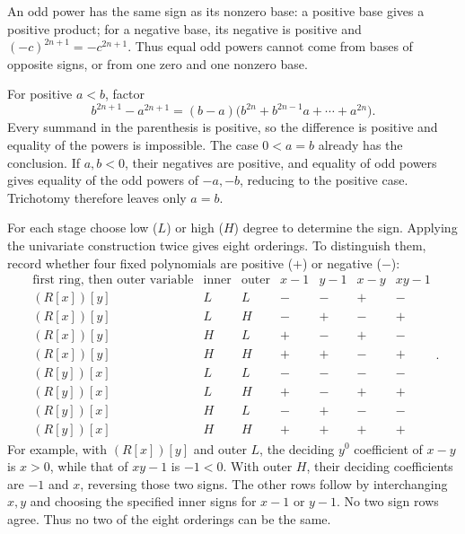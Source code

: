 An odd power has the same sign as its nonzero base: a positive base gives a positive product; for a negative base, its negative is positive and $( -c)^{2n+1}=-c^{2n+1}$. Thus equal odd powers cannot come from bases of opposite signs, or from one zero and one nonzero base.\par
For positive $a<b$, factor
\[b^{2n+1}-a^{2n+1}=(b-a)\bigl(b^{2n}+b^{2n-1}a+\cdots+a^{2n}\bigr).
\]
Every summand in the parenthesis is positive, so the difference is positive and equality of the powers is impossible. The case $0<a=b$ already has the conclusion. If $a,b<0$, their negatives are positive, and equality of odd powers gives equality of the odd powers of $-a,-b$, reducing to the positive case. Trichotomy therefore leaves only $\boxed{a=b}$.

For each stage choose low ($L$) or high ($H$) degree to determine the sign. Applying the univariate construction twice gives eight orderings. To distinguish them, record whether four fixed polynomials are positive ($+$) or negative ($-$):
\[
\begin{array}{c|cc|cccc}
\text{first ring, then outer variable}&\text{inner}&\text{outer}&x-1&y-1&x-y&xy-1\\\hline
(R[x])[y]&L&L&-&-&+&-\\
(R[x])[y]&L&H&-&+&-&+\\
(R[x])[y]&H&L&+&-&+&-\\
(R[x])[y]&H&H&+&+&-&+\\
(R[y])[x]&L&L&-&-&-&-\\
(R[y])[x]&L&H&+&-&+&+\\
(R[y])[x]&H&L&-&+&-&-\\
(R[y])[x]&H&H&+&+&+&+
\end{array}.
\]
For example, with $(R[x])[y]$ and outer $L$, the deciding $y^0$ coefficient of $x-y$ is $x>0$, while that of $xy-1$ is $-1<0$. With outer $H$, their deciding coefficients are $-1$ and $x$, reversing those two signs. The other rows follow by interchanging $x,y$ and choosing the specified inner signs for $x-1$ or $y-1$. No two sign rows agree. Thus no two of the eight orderings can be the same.
